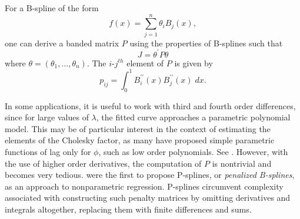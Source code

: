 For a B-spline of the form
\[
f\left(x\right) = \sum\limits_{j=1}^n \theta_i B_j\left(x\right),
\]
one can derive a banded matrix $P$ using the properties of B-splines such that 
 \[
 J = \theta^\prime P \theta
 \] 
 \noindent
 where $\theta = \left(\theta_1,\dots, \theta_n\right)$. The $i$-$j^{th}$ element of $P$ is given by
 \[
 p_{ij} = \int_0^1 B_i^{\prime \prime} \left( x \right)B_j^{\prime \prime} \left( x \right)\;dx.
 \]


%
%

In some applications, it is useful to work with third and fourth order differences, since for large values of $\lambda$, the fitted curve approaches a parametric polynomial model. This may be of particular interest in the context of estimating the elements of the Cholesky factor, as many have proposed simple parametric functions of lag only for $\phi$, such as low order polynomials. See \cite{pourahmadi1999joint}. However, with the use of higher order derivatives, the computation of $P$ is nontrivial and becomes very tedious. \cite{eilers1996flexible} were the first to propose P-splines, or \emph{penalized B-splines}, as an approach to nonparametric regression. P-splines circumvent complexity associated with constructing such penalty matrices by omitting derivatives and integrals altogether, replacing them with finite differences and sums. 

